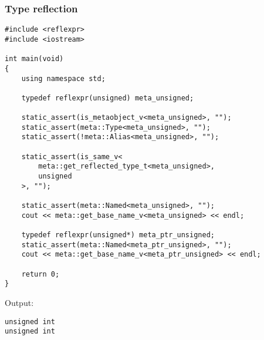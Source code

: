 \subsubsection{Type reflection}

\begin{verbatim}
#include <reflexpr>
#include <iostream>

int main(void)
{
	using namespace std;

	typedef reflexpr(unsigned) meta_unsigned;

	static_assert(is_metaobject_v<meta_unsigned>, "");
	static_assert(meta::Type<meta_unsigned>, "");
	static_assert(!meta::Alias<meta_unsigned>, "");

	static_assert(is_same_v<
		meta::get_reflected_type_t<meta_unsigned>,
		unsigned
	>, "");

	static_assert(meta::Named<meta_unsigned>, "");
	cout << meta::get_base_name_v<meta_unsigned> << endl;

	typedef reflexpr(unsigned*) meta_ptr_unsigned;
	static_assert(meta::Named<meta_ptr_unsigned>, "");
	cout << meta::get_base_name_v<meta_ptr_unsigned> << endl;

	return 0;
}
\end{verbatim}

Output:

\begin{verbatim}
unsigned int
unsigned int
\end{verbatim}

